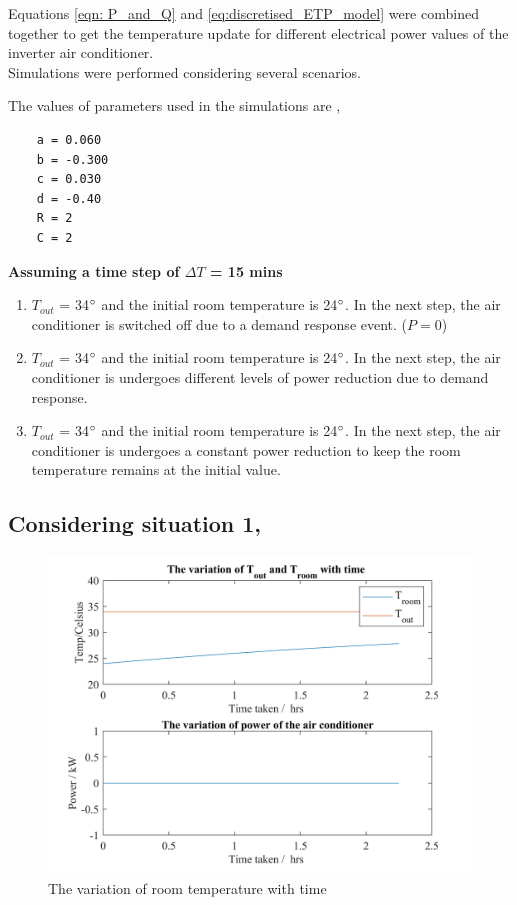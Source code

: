 \documentclass[12pt,a4paper]{article}
\begin{document}
\begin{itemize}
Equations \eqref{eqn: P_and_Q} and \eqref{eq:discretised_ETP_model} were combined together to get the temperature update for different electrical power values of the inverter air conditioner.\\

Simulations were performed considering several scenarios.

The values of parameters used in the simulations are \cite{7890446},
\begin{verbatim}
    a = 0.060 
    b = -0.300 
    c = 0.030 
    d = -0.40 
    R = 2 
    C = 2
\end{verbatim}



\textbf{Assuming a time step of $\Delta T$ = 15 mins}

\begin{enumerate}
    \item $T_{out}$ = 34$\degree$ and the initial room temperature is 24$\degree$. In the next step, the air conditioner is switched off due to a demand response event. ($P=0$) 
    
    \item $T_{out}$ = 34$\degree$ and the initial room temperature is 24$\degree$. In the next step, the air conditioner is undergoes different levels of power reduction due to demand response.
    
    \item $T_{out}$ = 34$\degree$ and the initial room temperature is 24$\degree$. In the next step, the air conditioner is undergoes a constant power reduction to keep the room temperature remains at the initial value.
    
\end{enumerate}

\subsection*{Considering situation 1,}

\begin{figure}[htb]
    \centering
    \includegraphics[width=13cm]{images/power_at_zero.jpg}
    \caption{The variation of room temperature with time}
    \label{fig:zeropower}
\end{figure}


\end{itemize}
\end{document}
